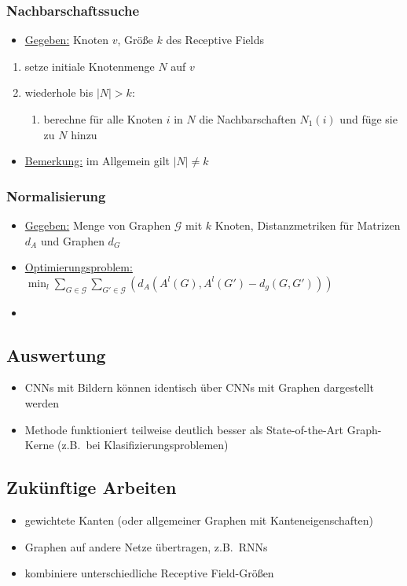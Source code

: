 \subsubsection{Nachbarschaftssuche}

\begin{itemize}
  \item \underline{Gegeben:} Knoten $v$, Größe $k$ des Receptive Fields
\end{itemize}

\begin{enumerate}
  \item setze initiale Knotenmenge $N$ auf $v$
  \item wiederhole bis $|N| > k$:
    \begin{enumerate}
      \item berechne für alle Knoten $i$ in $N$ die Nachbarschaften $N_1(i)$ und füge sie zu $N$ hinzu
    \end{enumerate}
\end{enumerate}

\begin{itemize}
  \item \underline{Bemerkung:} im Allgemein gilt $|N| \neq k$
\end{itemize}

\subsubsection{Normalisierung}

\begin{itemize}
  \item \underline{Gegeben:} Menge von Graphen $\mathcal{G}$ mit $k$ Knoten, Distanzmetriken für Matrizen $d_A$ und Graphen $d_G$
  \item \underline{Optimierungsproblem:} $\min_l \sum_{G \in \mathcal{G}} \sum_{G' \in \mathcal{G}} {( d_A(A^l(G), A^l(G') - d_g(G, G')) )}$
  \item {}
\end{itemize}

\subsection{Auswertung}

\begin{itemize}
  \item CNNs mit Bildern können identisch über CNNs mit Graphen dargestellt werden
  \item Methode funktioniert teilweise deutlich besser als State-of-the-Art Graph-Kerne (z.B.\ bei Klasifizierungsproblemen)
\end{itemize}

\subsection{Zukünftige Arbeiten}

\begin{itemize}
  \item gewichtete Kanten (oder allgemeiner Graphen mit Kanteneigenschaften)
  \item Graphen auf andere Netze übertragen, z.B.\ RNNs
  \item kombiniere unterschiedliche Receptive Field-Größen
\end{itemize}
